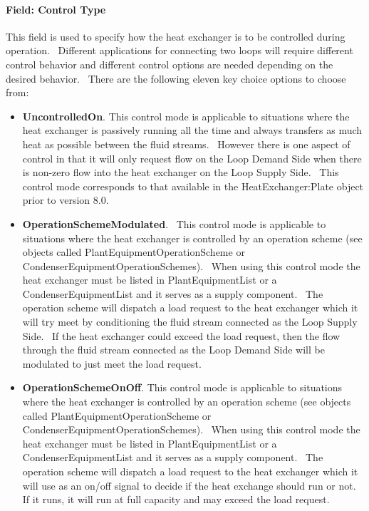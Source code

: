 \paragraph{Field: Control Type}\label{field-control-type}

This field is used to specify how the heat exchanger is to be controlled during operation.~ Different applications for connecting two loops will require different control behavior and different control options are needed depending on the desired behavior.~ There are the following eleven key choice options to choose from:

\begin{itemize}
\item
  \textbf{UncontrolledOn}. This control mode is applicable to situations where the heat exchanger is passively running all the time and always transfers as much heat as possible between the fluid streams.~ However there is one aspect of control in that it will only request flow on the Loop Demand Side when there is non-zero flow into the heat exchanger on the Loop Supply Side.~ This control mode corresponds to that available in the HeatExchanger:Plate object prior to version 8.0.
\item
  \textbf{OperationSchemeModulated}.~ This control mode is applicable to situations where the heat exchanger is controlled by an operation scheme (see objects called PlantEquipmentOperationScheme or CondenserEquipmentOperationSchemes).~ When using this control mode the heat exchanger must be listed in PlantEquipmentList or a CondenserEquipmentList and it serves as a supply component.~ The operation scheme will dispatch a load request to the heat exchanger which it will try meet by conditioning the fluid stream connected as the Loop Supply Side.~ If the heat exchanger could exceed the load request, then the flow through the fluid stream connected as the Loop Demand Side will be modulated to just meet the load request.
\item
  \textbf{OperationSchemeOnOff}. This control mode is applicable to situations where the heat exchanger is controlled by an operation scheme (see objects called PlantEquipmentOperationScheme or CondenserEquipmentOperationSchemes).~ When using this control mode the heat exchanger must be listed in PlantEquipmentList or a CondenserEquipmentList and it serves as a supply component.~ The operation scheme will dispatch a load request to the heat exchanger which it will use as an on/off signal to decide if the heat exchange should run or not.~ If it runs, it will run at full capacity and may exceed the load request.

\end{itemize}
